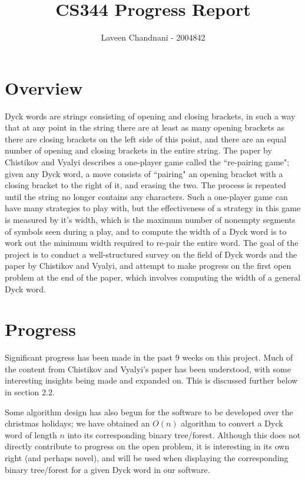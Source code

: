 \documentclass[a4paper]{article}
\title{CS344 Progress Report}
\author{Laveen Chandnani - 2004842}
\date{}
\begin{document}
	\maketitle
	\section{Overview}
	Dyck words are strings consisting of opening and closing brackets, in such a way that at any point in the string there are at least as many opening brackets as there are closing brackets on the left side of this point, and there are an equal number of opening and closing brackets in the entire string. The paper by Chistikov and Vyalyi \cite{chistikov2020re} describes a one-player game called the ``re-pairing game"; given any Dyck word, a move consists of ``pairing" an opening bracket with a closing bracket to the right of it, and erasing the two. The process is repeated until the string no longer contains any characters. Such a one-player game can have many strategies to play with, but the effectiveness of a strategy in this game is measured by it's width, which is the maximum number of nonempty segments of symbols seen during a play, and to compute the width of a Dyck word is to work out the minimum width required to re-pair the entire word.
	\newline
	\newline
	The goal of the project is to conduct a well-structured survey on the field of Dyck words and the paper by Chistikov and Vyalyi, and attempt to make progress on the first open problem at the end of the paper, which involves computing the width of a general Dyck word.
	
	\section{Progress}
	Significant progress has been made in the past 9 weeks on this project. Much of the content from Chistikov and Vyalyi's paper has been understood, with some interesting insights being made and expanded on. This is discussed further below in section 2.2.
	 
	Some algorithm design has also begun for the software to be developed over the christmas holidays; we have obtained an $O(n)$ algorithm to convert a Dyck word of length $n$ into its corresponding binary tree/forest. Although this does not directly contribute to progress on the open problem, it is interesting in its own right (and perhaps novel), and will be used when displaying the corresponding binary tree/forest for a given Dyck word in our software.
\end{document}
